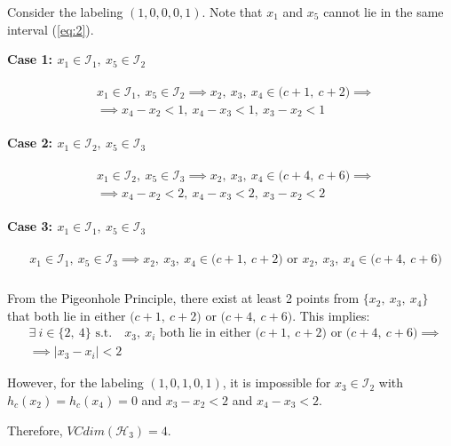 \documentclass[12pt]{article}
\begin{document}
\noindent Consider the labeling $(1, 0, 0, 0, 1)$. Note that $x_1$ and $x_5$ cannot lie in the same interval (\ref{eq:2}). 

\noindent \textbf{Case 1: $x_1 \in \mathcal{I}_1,\ x_5 \in \mathcal{I}_2$}

\begin{align*}
\begin{split}
    & x_1 \in \mathcal{I}_1,\ x_5 \in \mathcal{I}_2 \implies x_2,\ x_3,\ x_4 \in \big( c+1,\ c+2 \big) \implies \\
    & \implies x_4 - x_2 < 1,\ x_4 - x_3 < 1,\ x_3 - x_2 < 1
\end{split}
\end{align*}

\noindent \textbf{Case 2: $x_1 \in \mathcal{I}_2,\ x_5 \in \mathcal{I}_3$}

\begin{align*}
\begin{split}
    & x_1 \in \mathcal{I}_2,\ x_5 \in \mathcal{I}_3 \implies x_2,\ x_3,\ x_4 \in \big( c+4,\ c+6 \big) \implies \\
    & \implies x_4 - x_2 < 2,\ x_4 - x_3 < 2,\ x_3 - x_2 < 2
\end{split}
\end{align*}

\noindent \textbf{Case 3: $x_1 \in \mathcal{I}_1,\ x_5 \in \mathcal{I}_3$}

\begin{align*}
\begin{split}
    & x_1 \in \mathcal{I}_1,\ x_5 \in \mathcal{I}_3 \implies x_2,\ x_3,\ x_4 \in \big( c+1,\ c+2 \big) \text{ or } x_2,\ x_3,\ x_4 \in \big( c+4,\ c+6 \big) \\
\end{split}
\end{align*}

\noindent From the Pigeonhole Principle, there exist at least 2 points from $\{x_2,\ x_3,\ x_4\}$ that both lie in either $\big(c+1,\ c+2\big)$ or $\big(c+4,\ c+6\big)$. This implies:
\begin{align*}
    & \exists\ i \in \{2,\ 4\} \text{ s.t.} \quad x_3,\ x_i \text{ both lie in either } \big(c+1,\ c+2\big) \text{ or } \big(c+4,\ c+6\big) \implies \\
    & \implies |x_3 - x_i| < 2
\end{align*}

\noindent However, for the labeling $(1, 0, 1, 0, 1)$, it is impossible for $x_3 \in \mathcal{I}_2$ with $h_c(x_2) = h_c(x_4) = 0$ and $x_3 - x_2 < 2$ and $x_4 - x_3 < 2$.
\newline

\noindent Therefore, $VCdim(\mathcal{H}_3) = 4$.

\newpage
\printbibliography
\end{document}
